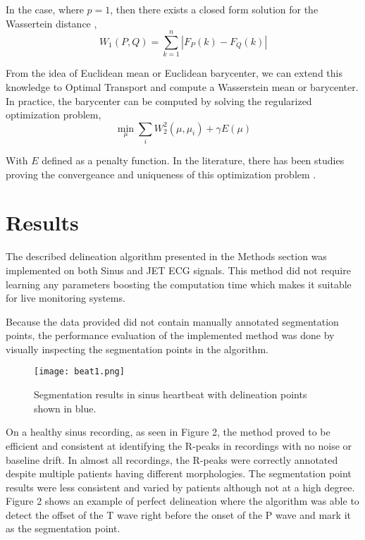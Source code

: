 \documentclass[conference,compsoc]{IEEEtran}
\begin{document}
In the case, where $p=1$, then there exists a closed form solution for the Wassertein distance \cite{PanaretosVictorM2019SAoW},
\begin{equation}
    W_1(P,Q) = \sum_{k=1}^n |F_P(k) - F_Q(k)|
\end{equation}

From the idea of Euclidean mean or Euclidean barycenter, we can extend this knowledge to Optimal Transport and compute a Wasserstein mean or barycenter. In practice, the barycenter can be computed by solving the regularized optimization problem,
\begin{equation}
    \min_{\mu}  \sum_{i} W_2^2(\mu, \mu_i) + \gamma E(\mu)
\end{equation}

With $E$ defined as a penalty function. In the literature, there has been studies proving the convergeance and uniqueness of this optimization problem \cite{BigotJérémie2019PoBi}.

\section{Results}

The described delineation algorithm presented in the Methods section was implemented on both Sinus and JET ECG signals. This method did not require learning any parameters boosting the computation time which makes it suitable for live monitoring systems.  

Because the data provided did not contain manually annotated segmentation points, the performance evaluation of the implemented method was done by visually inspecting the segmentation points in the algorithm.


\begin{figure}[h]
\centering
\texttt{[image: beat1.png]}
\caption{Segmentation results in sinus heartbeat with delineation points shown in blue.}
\label{fig_sim}
\end{figure}

On a healthy sinus recording, as seen in Figure 2, the method proved to be efficient and consistent at identifying the R-peaks in recordings with no noise or baseline drift. In almost all recordings, the R-peaks were correctly annotated despite multiple patients having different morphologies. The segmentation point results were less consistent and varied by patients although not at a high degree. Figure 2 shows an example of perfect delineation where the algorithm was able to detect the offset of the T wave right before the onset of the P wave and mark it as the segmentation point.
\end{document}
